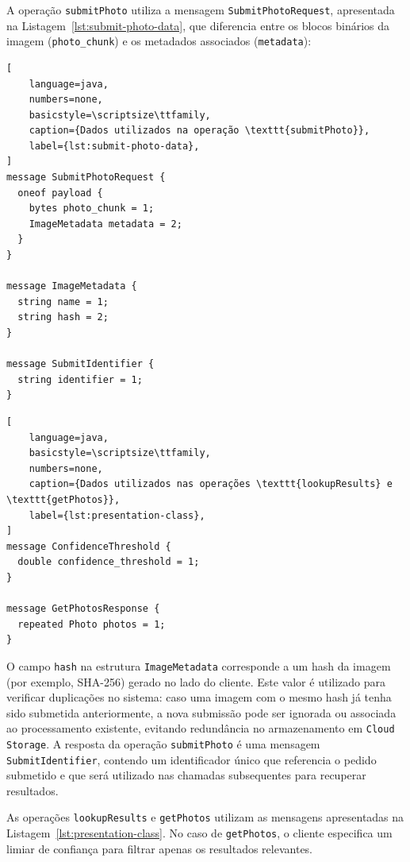 A operação \texttt{submitPhoto} utiliza a mensagem \texttt{SubmitPhotoRequest},
apresentada na Listagem~\ref{lst:submit-photo-data}, que diferencia entre os
blocos binários da imagem (\texttt{photo\_chunk}) e os metadados associados
(\texttt{metadata}):

\begin{center}
  \begin{minipage}{0.48\textwidth}
    \begin{lstlisting}[
    language=java,
    numbers=none,
    basicstyle=\scriptsize\ttfamily,
    caption={Dados utilizados na operação \texttt{submitPhoto}},
    label={lst:submit-photo-data},
]
message SubmitPhotoRequest {
  oneof payload {
    bytes photo_chunk = 1;
    ImageMetadata metadata = 2;
  }
}

message ImageMetadata {
  string name = 1;
  string hash = 2;
}

message SubmitIdentifier {
  string identifier = 1;
}
\end{lstlisting}
  \end{minipage}
  \hfill
  \begin{minipage}{0.48\textwidth}
    \begin{lstlisting}[
    language=java,
    basicstyle=\scriptsize\ttfamily,
    numbers=none,
    caption={Dados utilizados nas operações \texttt{lookupResults} e \texttt{getPhotos}},
    label={lst:presentation-class},
]
message ConfidenceThreshold {
  double confidence_threshold = 1;
}

message GetPhotosResponse {
  repeated Photo photos = 1;
}
\end{lstlisting}
  \end{minipage}
\end{center}

O campo \texttt{hash} na estrutura \texttt{ImageMetadata} corresponde a um hash
da imagem (por exemplo, SHA-256) gerado no lado do cliente. Este valor é
utilizado para verificar duplicações no sistema: caso uma imagem com o mesmo
hash já tenha sido submetida anteriormente, a nova submissão pode ser ignorada
ou associada ao processamento existente, evitando redundância no armazenamento
em \texttt{Cloud Storage}. A resposta da operação \texttt{submitPhoto} é uma
mensagem \texttt{SubmitIdentifier}, contendo um identificador único que
referencia o pedido submetido e que será utilizado nas chamadas subsequentes
para recuperar resultados.

As operações \texttt{lookupResults} e \texttt{getPhotos} utilizam as mensagens
apresentadas na Listagem~\ref{lst:presentation-class}. No caso de
\texttt{getPhotos}, o cliente especifica um limiar de confiança para filtrar
apenas os resultados relevantes.

